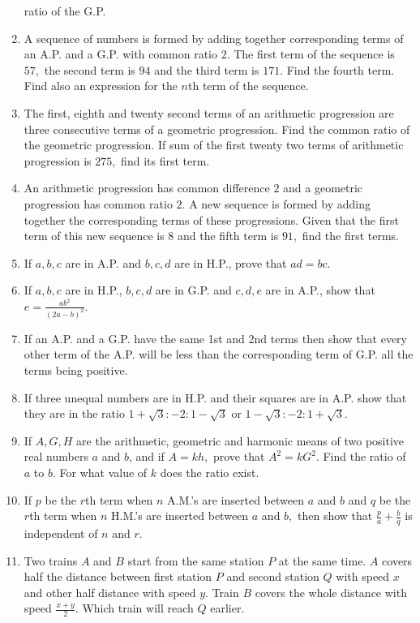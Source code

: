 \begin{enumerate}
  ratio of the G.P.
\item A sequence of numbers is formed by adding together corresponding terms of an A.P. and a G.P. with common ratio $2.$
  The first term of the sequence is $57,$ the second term is $94$ and the third term is $171.$ Find the fourth term. Find also an
  expression for the $n$th term of the sequence.
\item The first, eighth and twenty second terms of an arithmetic progression are three consecutive terms of a geometric
  progression. Find the common ratio of the geometric progression. If sum of the first twenty two terms of arithmetic progression
  is $275,$ find its first term.
\item An arithmetic progression has common difference $2$ and a geometric progression has common ratio $2.$ A new
  sequence is formed by adding together the corresponding terms of these progressions. Given that the first term of this new
  sequence is $8$ and the fifth term is $91,$ find the first terms.
\item If $a, b, c$ are in A.P. and $b, c, d$ are in H.P., prove that $ad = bc$.
\item If $a, b, c$ are in H.P., $b, c, d$ are in G.P. and $c, d, e$ are in A.P., show that $e = \frac{ab^2}{(2a - b)^2}$.
\item If an A.P. and a G.P. have the same 1st and 2nd terms then show that every other term of the A.P. will be less than
  the corresponding term of G.P. all the terms being positive.
\item If three unequal numbers are in H.P. and their squares are in A.P. show that they are in the ratio $1 +
  \sqrt{3}:-2:1 - \sqrt{3}$ or $1 - \sqrt{3}:-2:1 + \sqrt{3}$.
\item If $A, G, H$ are the arithmetic, geometric and harmonic means of two positive real numbers $a$ and $b$, and if $A =
  kh,$ prove that $A^2 = kG^2.$ Find the ratio of $a$ to $b.$ For what value of $k$ does the ratio exist.
\item If $p$ be the $r$th term when $n$ A.M.'s are inserted between $a$ and $b$ and $q$ be the $r$th term when $n$ H.M.'s
  are inserted between $a$ and $b,$ then show that $\frac{p}{a} + \frac{b}{q}$ is independent of $n$ and $r$.
\item Two trains $A$ and $B$ start from the same station $P$ at the same time. $A$ covers half the distance between first
  station $P$ and second station $Q$ with speed $x$ and other half distance with speed $y$. Train $B$ covers the whole distance
  with speed $\frac{x + y}{2}.$ Which train will reach $Q$ earlier.

\end{enumerate}
